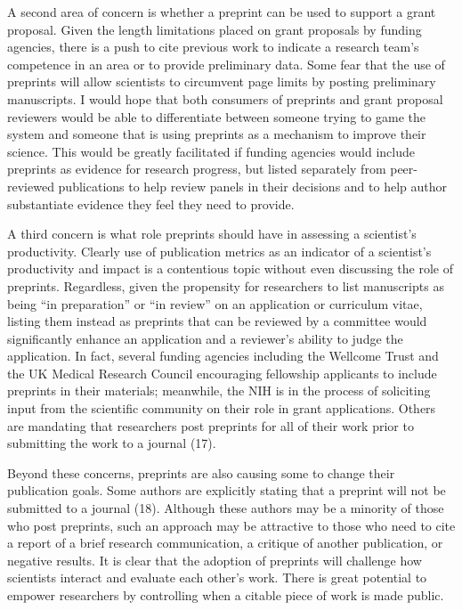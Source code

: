 \documentclass[11pt,]{article}
\begin{document}
A second area of concern is whether a preprint can be used to support a
grant proposal. Given the length limitations placed on grant proposals
by funding agencies, there is a push to cite previous work to indicate a
research team's competence in an area or to provide preliminary data.
Some fear that the use of preprints will allow scientists to circumvent
page limits by posting preliminary manuscripts. I would hope that both
consumers of preprints and grant proposal reviewers would be able to
differentiate between someone trying to game the system and someone that
is using preprints as a mechanism to improve their science. This would
be greatly facilitated if funding agencies would include preprints as
evidence for research progress, but listed separately from peer-reviewed
publications to help review panels in their decisions and to help author
substantiate evidence they feel they need to provide.

A third concern is what role preprints should have in assessing a
scientist's productivity. Clearly use of publication metrics as an
indicator of a scientist's productivity and impact is a contentious
topic without even discussing the role of preprints. Regardless, given
the propensity for researchers to list manuscripts as being ``in
preparation'' or ``in review'' on an application or curriculum vitae,
listing them instead as preprints that can be reviewed by a committee
would significantly enhance an application and a reviewer's ability to
judge the application. In fact, several funding agencies including the
Wellcome Trust and the UK Medical Research Council encouraging
fellowship applicants to include preprints in their materials;
meanwhile, the NIH is in the process of soliciting input from the
scientific community on their role in grant applications. Others are
mandating that researchers post preprints for all of their work prior to
submitting the work to a journal (17).

Beyond these concerns, preprints are also causing some to change their
publication goals. Some authors are explicitly stating that a preprint
will not be submitted to a journal (18). Although these authors may be a
minority of those who post preprints, such an approach may be attractive
to those who need to cite a report of a brief research communication, a
critique of another publication, or negative results. It is clear that
the adoption of preprints will challenge how scientists interact and
evaluate each other's work. There is great potential to empower
researchers by controlling when a citable piece of work is made public.
\end{document}
